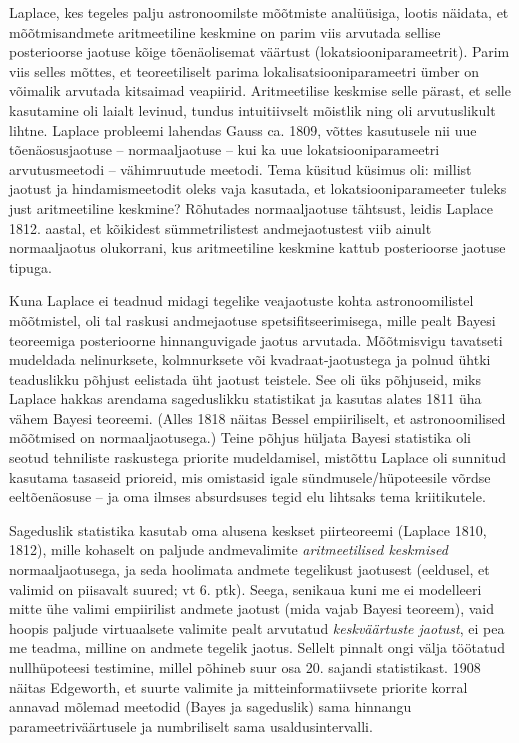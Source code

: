 \documentclass[]{book}
\begin{document}
Laplace, kes tegeles palju astronoomilste mõõtmiste analüüsiga, lootis näidata, et mõõtmisandmete aritmeetiline keskmine on parim viis arvutada sellise posterioorse jaotuse kõige tõenäolisemat väärtust (lokatsiooniparameetrit).
Parim viis selles mõttes, et teoreetiliselt parima lokalisatsiooniparameetri ümber on võimalik arvutada kitsaimad veapiirid.
Aritmeetilise keskmise selle pärast, et selle kasutamine oli laialt levinud, tundus intuitiivselt mõistlik ning oli arvutuslikult lihtne. Laplace probleemi lahendas Gauss ca. 1809, võttes kasutusele nii uue tõenäosusjaotuse -- normaaljaotuse -- kui ka uue lokatsiooniparameetri arvutusmeetodi -- vähimruutude meetodi. Tema küsitud küsimus oli: millist jaotust ja hindamismeetodit oleks vaja kasutada, et lokatsiooniparameeter tuleks just aritmeetiline keskmine?
Rõhutades normaaljaotuse tähtsust, leidis Laplace 1812. aastal, et kõikidest sümmetrilistest andmejaotustest viib ainult normaaljaotus olukorrani, kus aritmeetiline keskmine kattub posterioorse jaotuse tipuga.

Kuna Laplace ei teadnud midagi tegelike veajaotuste kohta astronoomilistel mõõtmistel, oli tal raskusi andmejaotuse spetsifitseerimisega, mille pealt Bayesi teoreemiga posterioorne hinnanguvigade jaotus arvutada. Mõõtmisvigu tavatseti mudeldada nelinurksete, kolmnurksete või kvadraat-jaotustega ja polnud ühtki teaduslikku põhjust eelistada üht jaotust teistele. See oli üks põhjuseid, miks Laplace hakkas arendama sageduslikku statistikat ja kasutas alates 1811 üha vähem Bayesi teoreemi. (Alles 1818 näitas Bessel empiiriliselt, et astronoomilised mõõtmised on normaaljaotusega.) Teine põhjus hüljata Bayesi statistika oli seotud tehniliste raskustega priorite mudeldamisel, mistõttu Laplace oli sunnitud kasutama tasaseid prioreid, mis omistasid igale sündmusele/hüpoteesile võrdse eeltõenäosuse -- ja oma ilmses absurdsuses tegid elu lihtsaks tema kriitikutele.

Sageduslik statistika kasutab oma alusena keskset piirteoreemi (Laplace 1810, 1812), mille kohaselt on paljude andmevalimite \emph{aritmeetilised keskmised} normaaljaotusega, ja seda hoolimata andmete tegelikust jaotusest (eeldusel, et valimid on piisavalt suured; vt 6. ptk). Seega, senikaua kuni me ei modelleeri mitte ühe valimi empiirilist andmete jaotust (mida vajab Bayesi teoreem), vaid hoopis paljude virtuaalsete valimite pealt arvutatud \emph{keskväärtuste jaotust}, ei pea me teadma, milline on andmete tegelik jaotus. Sellelt pinnalt ongi välja töötatud nullhüpoteesi testimine, millel põhineb suur osa 20. sajandi statistikast.
1908 näitas Edgeworth, et suurte valimite ja mitteinformatiivsete priorite korral annavad mõlemad meetodid (Bayes ja sageduslik) sama hinnangu parameetriväärtusele ja numbriliselt sama usaldusintervalli.
\end{document}
